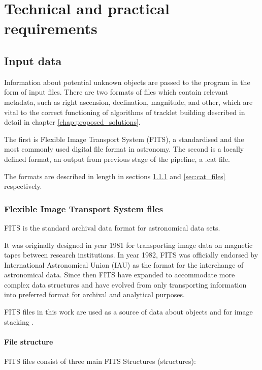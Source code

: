 \chapter{Technical and practical requirements}\label{chap:requirements}


\section{Input data}\label{sec:input_data}

	Information about potential unknown objects are passed to the program in the form of input files. There are two formats of files which contain relevant metadata, such as right ascension, declination, magnitude, and other, which are vital to the correct functioning of algorithms of tracklet building described in detail in chapter \ref{chap:proposed_solutions}. 
	
	The first is Flexible Image Transport System (FITS), a standardised and the most commonly used digital file format in astronomy. The second is a locally defined format, an output from previous stage of the pipeline, a .cat file. 
	
	The formats are described in length in sections \ref{sec:fits_files} and \ref{sec:cat_files} respectively.
\subsection{Flexible Image Transport System files}\label{sec:fits_files}
	
	FITS is the standard archival data format for astronomical data sets. 
	
	It was originally designed in year 1981 for transporting image data on magnetic tapes between research institutions. In year 1982, FITS was officially endorsed by International Astronomical Union (IAU) as the format for the interchange of astronomical data. Since then FITS have expanded to accommodate more complex data structures and have evolved from only transporting information into preferred format for archival and analytical purposes.
	
	FITS files in this work are used as a source of data about objects and for image stacking \citep{FITSdefinition}.
	
\subsubsection{File structure}

	FITS files consist of three main FITS Structures (structures):
	
